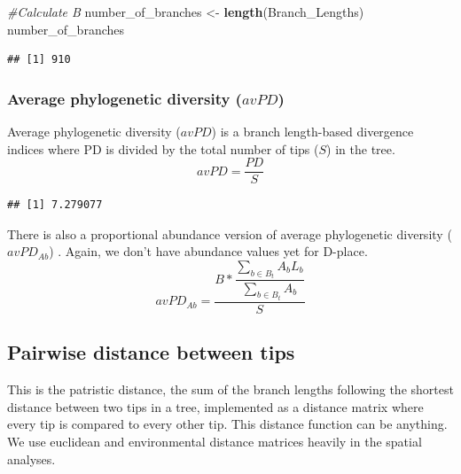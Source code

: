 \documentclass[]{book}
\newenvironment{Shaded}{\begin{snugshade}}{\end{snugshade}}
\newcommand{\KeywordTok}[1]{\textcolor[rgb]{0.13,0.29,0.53}{\textbf{{#1}}}}
\newcommand{\StringTok}[1]{\textcolor[rgb]{0.31,0.60,0.02}{{#1}}}
\newcommand{\CommentTok}[1]{\textcolor[rgb]{0.56,0.35,0.01}{\textit{{#1}}}}
\newcommand{\OperatorTok}[1]{\textcolor[rgb]{0.81,0.36,0.00}{\textbf{{#1}}}}
\newcommand{\NormalTok}[1]{{#1}}
\theoremstyle{definition}
\theoremstyle{definition}
\theoremstyle{definition}
\theoremstyle{remark}
\begin{document}
\begin{Shaded}
\begin{Highlighting}[]
\CommentTok{#Calculate B}
\NormalTok{number_of_branches <-}\StringTok{ }\KeywordTok{length}\NormalTok{(Branch_Lengths)}
\NormalTok{number_of_branches}
\end{Highlighting}
\end{Shaded}

\begin{verbatim}
## [1] 910
\end{verbatim}

\subsubsection{\texorpdfstring{Average phylogenetic diversity
(\(avPD\))}{Average phylogenetic diversity (avPD)}}\label{average-phylogenetic-diversity-avpd}

Average phylogenetic diversity (\(avPD\)) \citep{Clarke2001} is a branch
length-based divergence indices where PD is divided by the total number
of tips (\(S\)) in the tree. \[avPD = \dfrac{PD}{S}\]

\begin{Shaded}
\end{Shaded}

\begin{verbatim}
## [1] 7.279077
\end{verbatim}

There is also a proportional abundance version of average phylogenetic
diversity (\(avPD_{Ab}\)) \citep{Tucker2016}. Again, we don't have
abundance values yet for D-place.
\[avPD_{Ab} = \dfrac{B * \dfrac{\sum_{b \in B_{t}}^{}A_{b}L_{b}}{\sum_{b \in B_{t}}^{}A_{b}}}{S}\]

\hypertarget{pairwise-distance-between-tips}{\subsection{Pairwise
distance between tips}\label{pairwise-distance-between-tips}}

This is the patristic distance, the sum of the branch lengths following
the shortest distance between two tips in a tree, implemented as a
distance matrix where every tip is compared to every other tip. This
distance function can be anything. We use euclidean and environmental
distance matrices heavily in the spatial analyses.
\end{document}
